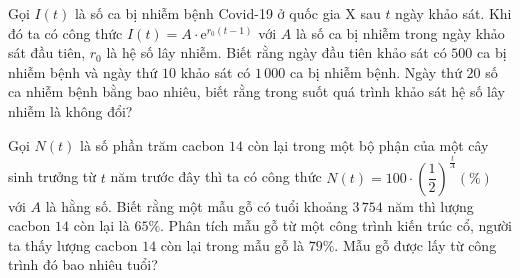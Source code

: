 \begin{ex}%
	Gọi $I(t)$ là số ca bị nhiễm bệnh Covid-19 ở quốc gia X sau $t$ ngày khảo sát. Khi đó ta có công thức $I(t)=A\cdot\mathrm{e}^{r_0(t-1)}$ với $A$ là số ca bị nhiễm trong ngày khảo sát đầu tiên, $r_0$ là hệ số lây nhiễm. Biết rằng ngày đầu tiên khảo sát có  $500$ ca bị nhiễm bệnh và ngày thứ $10$ khảo sát có $1\,000$ ca bị nhiễm bệnh. Ngày thứ $20$ số ca nhiễm bệnh bằng bao nhiêu, biết rằng trong suốt quá trình khảo sát hệ số lây nhiễm là không đổi?
\end{ex}

\begin{ex}%
	Gọi $N(t)$ là số phần trăm cacbon $14$ còn lại trong một bộ phận của một cây sinh trưởng từ $t$ năm trước đây thì ta có công thức $N(t)=100\cdot\left(\dfrac{1}{2}\right)^{\tfrac{t}{A}}(\%)$ với $A$ là hằng số. Biết rằng một mẫu gỗ có tuổi khoảng $3\,754$ năm thì lượng cacbon $14$  còn lại là $65\%$. Phân tích mẫu gỗ từ một công trình kiến trúc cổ, người ta thấy lượng cacbon $14$ còn lại trong mẫu gỗ là $79\%$. Mẫu gỗ được lấy từ công trình đó bao nhiêu tuổi?
\end{ex}

